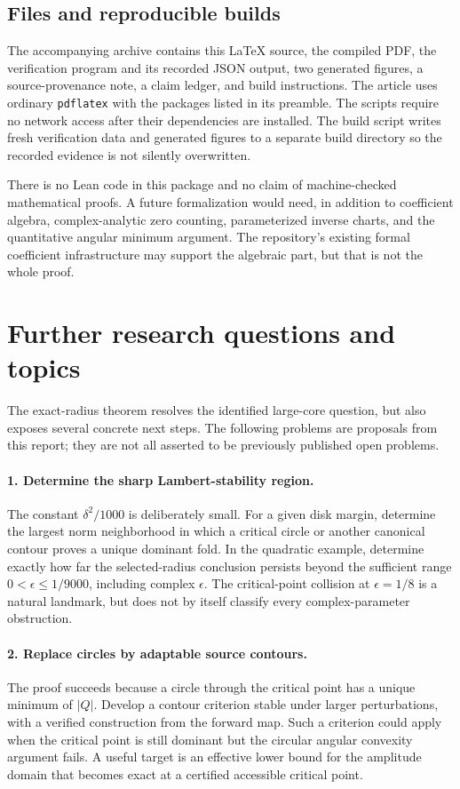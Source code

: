 \documentclass[11pt,a4paper]{article}
\numberwithin{equation}{section}
\theoremstyle{definition}
\theoremstyle{remark}
\begin{document}
\subsection{Files and reproducible builds}
The accompanying archive contains this \LaTeX{} source, the compiled PDF, the verification program and its recorded JSON output, two generated figures, a source-provenance note, a claim ledger, and build instructions. The article uses ordinary \texttt{pdflatex} with the packages listed in its preamble. The scripts require no network access after their dependencies are installed. The build script writes fresh verification data and generated figures to a separate build directory so the recorded evidence is not silently overwritten.

There is no Lean code in this package and no claim of machine-checked mathematical proofs. A future formalization would need, in addition to coefficient algebra, complex-analytic zero counting, parameterized inverse charts, and the quantitative angular minimum argument. The repository's existing formal coefficient infrastructure may support the algebraic part, but that is not the whole proof.

\section{Further research questions and topics}
\label{sec:questions}
The exact-radius theorem resolves the identified large-core question, but also exposes several concrete next steps. The following problems are proposals from this report; they are not all asserted to be previously published open problems.

\paragraph{1. Determine the sharp Lambert-stability region.}
The constant $\delta^2/1000$ is deliberately small. For a given disk margin, determine the largest norm neighborhood in which a critical circle or another canonical contour proves a unique dominant fold. In the quadratic example, determine exactly how far the selected-radius conclusion persists beyond the sufficient range $0<\epsilon\leq1/9000$, including complex $\epsilon$. The critical-point collision at $\epsilon=1/8$ is a natural landmark, but does not by itself classify every complex-parameter obstruction.

\paragraph{2. Replace circles by adaptable source contours.}
The proof succeeds because a circle through the critical point has a unique minimum of $|Q|$. Develop a contour criterion stable under larger perturbations, with a verified construction from the forward map. Such a criterion could apply when the critical point is still dominant but the circular angular convexity argument fails. A useful target is an effective lower bound for the amplitude domain that becomes exact at a certified accessible critical point.
\end{document}
